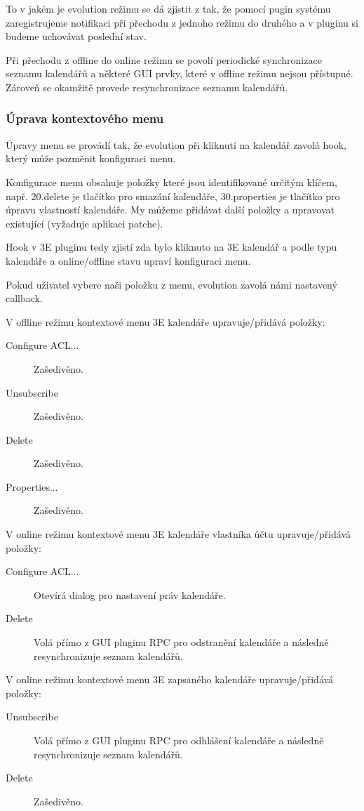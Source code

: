 \documentclass[a4paper,10pt]{article}
\begin{document}
\begin{multicols*}{2}
To v jakém je evolution režimu se dá zjistit z tak, že pomocí pugin systému 
zaregistrujeme notifikaci při přechodu z jednoho režimu do druhého a v pluginu
si budeme uchovávat poslední stav.

Při přechodu z offline do online režimu se povolí periodické synchronizace
seznamu kalendářů a některé GUI prvky, které v offline režimu nejsou přístupné.
Zároveň se okamžitě provede resynchronizace seznamu kalendářů.

\subsubsection{Úprava kontextového menu}

Úpravy menu se provádí tak, že evolution při kliknutí na kalendář zavolá hook,
který může pozměnit konfiguraci menu.

Konfigurace menu obsahuje položky které jsou identifikované určitým klíčem, např. 20.delete
je tlačítko pro smazání kalendáře, 30.properties je tlačítko pro úpravu
vlastností kalendáře. My můžeme přidávat další položky a upravovat existující
(vyžaduje aplikaci patche).

Hook v 3E pluginu tedy zjistí zda bylo kliknuto na 3E kalendář a podle typu
kalendáře a online/offline stavu upraví konfiguraci menu.

Pokud uživatel vybere naši položku z menu, evolution zavolá námi nastavený
callback.

V offline režimu kontextové menu 3E kalendáře upravuje/přidává položky:
\begin{description}
\item [Configure ACL...] Zašedivěno.
\item [Unsubscribe] Zašedivěno.
\item [Delete] Zašedivěno.
\item [Properties...] Zašedivěno.
\end{description}

V online režimu kontextové menu 3E kalendáře vlastníka účtu upravuje/přidává položky:
\begin{description}
\item [Configure ACL...] Otevírá dialog pro nastavení práv kalendáře.
\item [Delete] Volá přímo z GUI pluginu RPC pro odstranění kalendáře a následně 
resynchronizuje seznam kalendářů.
\end{description}

\newpage
V online režimu kontextové menu 3E zapsaného kalendáře upravuje/přidává položky:
\begin{description}
\item [Unsubscribe] Volá přímo z GUI pluginu RPC pro
odhlášení kalendáře a následně resynchronizuje seznam kalendářů.
\item [Delete] Zašedivěno.
\end{description}


\end{multicols*}
\end{document}
